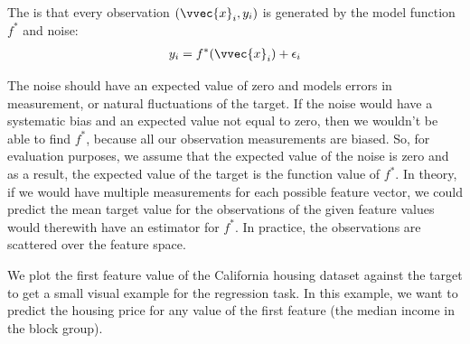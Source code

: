 \documentclass[letterpaper,10pt,english]{jupyterBook}
\begin{document}
\sphinxAtStartPar
The  is that every observation \((\vvec{x}_i,y_i)\) is generated by the  model function \(f^*\) and noise:
\begin{equation*}
\begin{split}y_i=f^*(\vvec{x}_i)+\epsilon_i\end{split}
\end{equation*}

\sphinxAtStartPar
The noise should have an expected value of zero and models errors in measurement, or natural fluctuations of the target. If the noise would have a systematic bias and an expected value not equal to zero, then we wouldn’t be able to find \(f^*\), because all our observation measurements are biased. So, for evaluation purposes, we assume that the expected value of the noise is zero and as a result, the expected value of the target is the function value of \(f^*\).
In theory, if we would have multiple measurements for each possible feature vector, we could predict the mean target value for the observations of the given feature values would therewith have an estimator for \(f^*\). In practice, the observations are scattered over the feature space.

\sphinxAtStartPar
We plot the first feature value of the California housing dataset against the target to get a small visual example for the regression task. In this example, we want to predict the housing price for any value of the first feature  (the median income in the block group).
\end{document}
